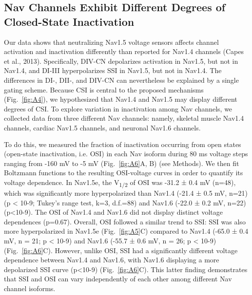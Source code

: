 \subsection{Nav Channels Exhibit Different Degrees of Closed-State Inactivation}
Our data shows that neutralizing Nav1.5 voltage sensors affects channel activation and inactivation differently than reported for Nav1.4 channels (Capes et al., 2013). Specifically, DIV-CN depolarizes activation in Nav1.5, but not in Nav1.4, and DI-III hyperpolarizes SSI in Nav1.5, but not in Nav1.4. The differences in DI-, DII-, and DIV-CN can nevertheless be explained by a single gating scheme. Because CSI is central to the proposed mechanisms (Fig.~\ref{fig:A4}), we hypothesized that Nav1.4 and Nav1.5 may display different degrees of CSI. To explore variation in inactivation among Nav channels, we collected data from three different Nav channels: namely, skeletal muscle Nav1.4 channels, cardiac Nav1.5 channels, and neuronal Nav1.6 channels. 

To do this, we measured the fraction of inactivation occurring from open states (open-state inactivation, i.e. OSI) in each Nav isoform during 80 ms voltage steps ranging from -160 mV to -5 mV (Fig.~\ref{fig:A6}A, B) (see Methods). We then fit Boltzmann functions to the resulting OSI-voltage curves in order to quantify its voltage dependence. In Nav1.5e, the V\textsubscript{1/2} of OSI was -31.2 ± 0.4 mV (n=48), which was significantly more hyperpolarized than Nav1.4 (-21.4 ± 0.5 mV, n=21) (p < 10-9; Tukey’s range test, k=3, d.f.=88) and Nav1.6 (-22.0 ± 0.2 mV, n=22) (p<10-9). The OSI of Nav1.4 and Nav1.6 did not display distinct voltage dependences (p=0.67). Overall, OSI followed a similar trend to SSI: SSI was also more hyperpolarized in Nav1.5e (Fig.~\ref{fig:A5}C) compared to Nav1.4 (-65.0 ± 0.4 mV, n = 21; p < 10-9) and Nav1.6 (-55.7 ± 0.6 mV, n = 26; p < 10-9) (Fig.~\ref{fig:A6}C). However, unlike OSI, SSI had a significantly different voltage dependence between Nav1.4 and Nav1.6, with Nav1.6 displaying a more depolarized SSI curve (p<10-9) (Fig.~\ref{fig:A6}C). This latter finding demonstrates that SSI and OSI can vary independently of each other among different Nav channel isoforms. 

